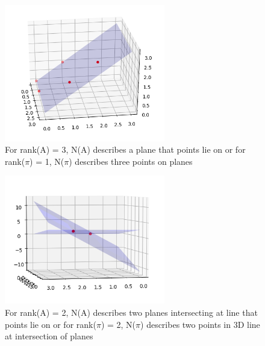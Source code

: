 \documentclass[12pt]{article}%
\begin{document}
    \begin{figure}[H]
    \begin{center}
    \includegraphics[width=7cm]{rank_3.png}
    \caption{\label{f:rank_3} For rank(A) = 3, N(A) describes a plane that points lie on or for rank($\pi$) = 1, N($\pi$) describes three points on planes}
    \end{center}
    \end{figure}
    
     \begin{figure}[H]
    \begin{center}
    \includegraphics[width=7cm]{rank_2.png}
    \caption{\label{f:rank_2} For rank(A) = 2, N(A) describes two planes intersecting at line that points lie on or for rank($\pi$) = 2, N($\pi$) describes two points in 3D line at intersection of planes}
    \end{center}
    \end{figure}
    
\end{document}
